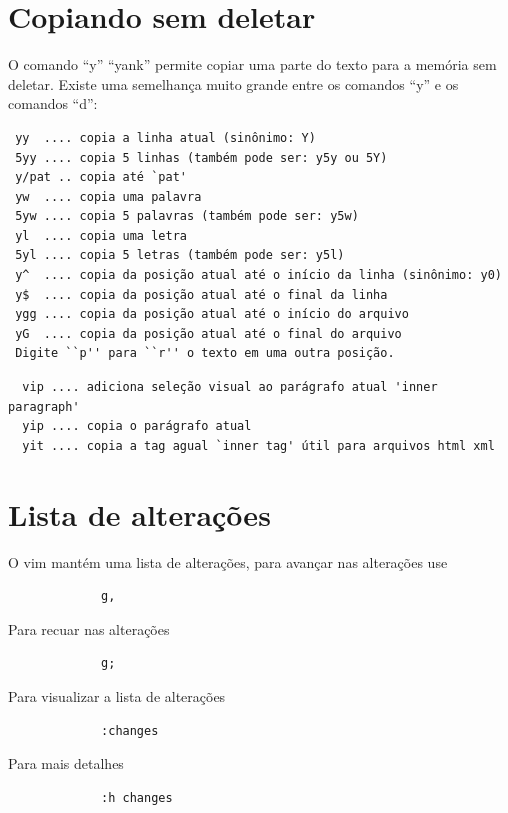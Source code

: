 \documentclass[10pt,a4paper,openany]{book}
\begin{document}
\section{Copiando sem deletar}\label{Copiando sem deletar}

O comando ``y'' ``yank'' permite copiar uma parte do texto para a memória sem deletar.
Existe uma semelhança muito grande entre os comandos ``y'' e os comandos ``d'':

\begin{verbatim}
 yy  .... copia a linha atual (sinônimo: Y)
 5yy .... copia 5 linhas (também pode ser: y5y ou 5Y)
 y/pat .. copia até `pat'
 yw  .... copia uma palavra
 5yw .... copia 5 palavras (também pode ser: y5w)
 yl  .... copia uma letra
 5yl .... copia 5 letras (também pode ser: y5l)
 y^  .... copia da posição atual até o início da linha (sinônimo: y0)
 y$  .... copia da posição atual até o final da linha
 ygg .... copia da posição atual até o início do arquivo
 yG  .... copia da posição atual até o final do arquivo
 Digite ``p'' para ``r'' o texto em uma outra posição.
\end{verbatim}

\begin{verbatim}
  vip .... adiciona seleção visual ao parágrafo atual 'inner paragraph'
  yip .... copia o parágrafo atual
  yit .... copia a tag agual `inner tag' útil para arquivos html xml
\end{verbatim}

\section{Lista de alterações}
O vim mantém uma lista de alterações, para avançar nas alterações use

\begin{verbatim}
			 g,
\end{verbatim}

Para recuar nas alterações

\begin{verbatim}
			 g;
\end{verbatim}

Para visualizar a lista de alterações

\begin{verbatim}
			 :changes
\end{verbatim}

Para mais detalhes

\begin{verbatim}
			 :h changes
\end{verbatim}
\end{document}
